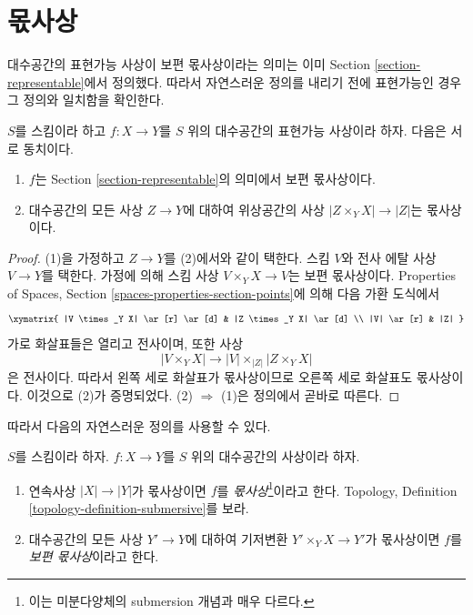 \section{몫사상}
\label{section-submersive}

\noindent
대수공간의 표현가능 사상이 보편 몫사상이라는 의미는 이미
Section \ref{section-representable}에서 정의했다.
따라서 자연스러운 정의를 내리기 전에 표현가능인 경우 그 정의와
일치함을 확인한다.

\begin{lemma}
\label{lemma-characterize-representable-universally-submersive}
$S$를 스킴이라 하고 $f : X \to Y$를 $S$ 위의 대수공간의
표현가능 사상이라 하자. 다음은 서로 동치이다.
\begin{enumerate}
\item $f$는 Section \ref{section-representable}의 의미에서
보편 몫사상이다.
\item 대수공간의 모든 사상 $Z \to Y$에 대하여 위상공간의 사상
$|Z \times_Y X| \to |Z|$는 몫사상이다.
\end{enumerate}
\end{lemma}

\begin{proof}
(1)을 가정하고 $Z \to Y$를 (2)에서와 같이 택한다.
스킴 $V$와 전사 에탈 사상 $V \to Y$를 택한다.
가정에 의해 스킴 사상 $V \times_Y X \to V$는 보편 몫사상이다.
Properties of Spaces, Section \ref{spaces-properties-section-points}에 의해
다음 가환 도식에서
$$
\xymatrix{
|V \times_Y X| \ar[r] \ar[d] & |Z \times_Y X| \ar[d] \\
|V| \ar[r] & |Z|
}
$$
가로 화살표들은 열리고 전사이며, 또한 사상
$$
|V \times_Y X| \longrightarrow |V| \times_{|Z|} |Z \times_Y X|
$$
은 전사이다. 따라서 왼쪽 세로 화살표가 몫사상이므로 오른쪽 세로
화살표도 몫사상이다. 이것으로 (2)가 증명되었다.
(2) $\Rightarrow$ (1)은 정의에서 곧바로 따른다.
\end{proof}

\noindent
따라서 다음의 자연스러운 정의를 사용할 수 있다.

\begin{definition}
\label{definition-submersive}
$S$를 스킴이라 하자.
$f : X \to Y$를 $S$ 위의 대수공간의 사상이라 하자.
\begin{enumerate}
\item 연속사상 $|X| \to |Y|$가 몫사상이면
$f$를 {\it 몫사상}\footnote{이는 미분다양체의 submersion 개념과
매우 다르다.}이라고 한다. Topology, Definition
\ref{topology-definition-submersive}를 보라.
\item 대수공간의 모든 사상 $Y' \to Y$에 대하여 기저변환
$Y' \times_Y X \to Y'$가 몫사상이면 $f$를
{\it 보편 몫사상}이라고 한다.
\end{enumerate}
\end{definition}

